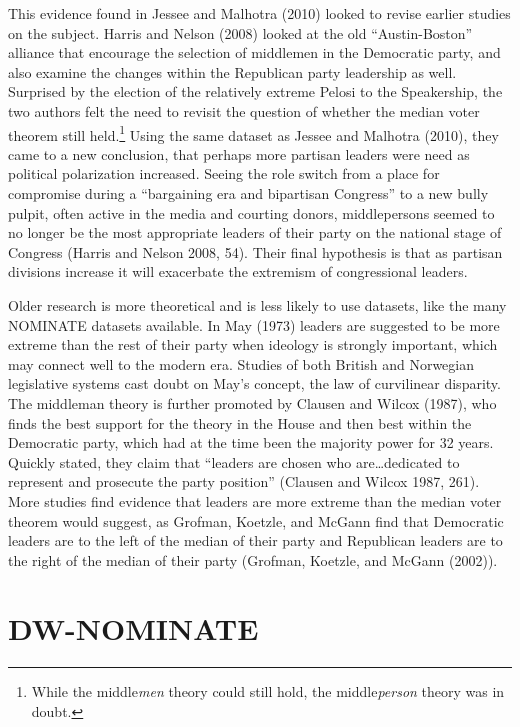 \documentclass[12pt,twoside]{reedthesis}
\begin{document}
  This evidence found in Jessee and Malhotra (2010) looked to revise
  earlier studies on the subject. Harris and Nelson (2008) looked at the
  old ``Austin-Boston'' alliance that encourage the selection of middlemen
  in the Democratic party, and also examine the changes within the
  Republican party leadership as well. Surprised by the election of the
  relatively extreme Pelosi to the Speakership, the two authors felt the
  need to revisit the question of whether the median voter theorem still
  held.\footnote{While the middle\emph{men} theory could still hold, the
    middle\emph{person} theory was in doubt.} Using the same dataset as
  Jessee and Malhotra (2010), they came to a new conclusion, that perhaps
  more partisan leaders were need as political polarization increased.
  Seeing the role switch from a place for compromise during a ``bargaining
  era and bipartisan Congress'' to a new bully pulpit, often active in the
  media and courting donors, middlepersons seemed to no longer be the most
  appropriate leaders of their party on the national stage of Congress
  (Harris and Nelson 2008, 54). Their final hypothesis is that as partisan
  divisions increase it will exacerbate the extremism of congressional
  leaders.
  
  Older research is more theoretical and is less likely to use datasets,
  like the many NOMINATE datasets available. In May (1973) leaders are
  suggested to be more extreme than the rest of their party when ideology
  is strongly important, which may connect well to the modern era. Studies
  of both British and Norwegian legislative systems cast doubt on May's
  concept, the law of curvilinear disparity. The middleman theory is
  further promoted by Clausen and Wilcox (1987), who finds the best
  support for the theory in the House and then best within the Democratic
  party, which had at the time been the majority power for 32 years.
  Quickly stated, they claim that ``leaders are chosen who
  are\ldots{}dedicated to represent and prosecute the party position''
  (Clausen and Wilcox 1987, 261). More studies find evidence that leaders
  are more extreme than the median voter theorem would suggest, as
  Grofman, Koetzle, and McGann find that Democratic leaders are to the
  left of the median of their party and Republican leaders are to the
  right of the median of their party (Grofman, Koetzle, and McGann
  (2002)).
  
  \section{DW-NOMINATE}\label{dw-nominate}
  
\end{document}
